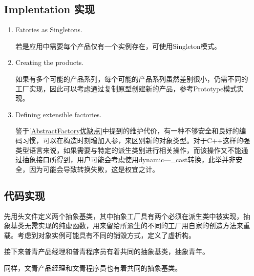 \subsection{Implentation 实现}

\begin{enumerate}

\item Fatories as Singletons.

      若是应用中需要每个产品仅有一个实例存在，可使用Singleton模式。

\item Creating the products.

      如果有多个可能的产品系列，每个可能的产品系列虽然差别很小，仍需不同的工厂实现，因此可以考虑通过复制原型创建新的产品，参考Prototype模式实现。

\item Defining extensible factories.

      鉴于\ref{AbstractFactory优缺点}中提到的维护代价，有一种不够安全和良好的编码习惯，可以在构造时刻增加入参，来区别新的对象类型。对于C++这样的强类型语言来说，如果需要与特定的派生类别进行相关操作，而该操作又不能通过抽象接口所得到，用户可能会考虑使用dynamic—_cast转换，此举并非安全，因为可能会导致转换失败，这是权宜之计。

\end{enumerate}

\subsection{代码实现}

    先用头文件定义两个抽象基类，其中抽象工厂具有两个必须在派生类中被实现，抽象基类无需实现的纯虚函数，用来留给所派生的不同的工厂用自家的创造方法来重载。考虑到对象实例可能具有不同的销毁方式，定义了虚析构。

    接下来普青产品经理和普青程序员有着共同的抽象基类，抽象青年。

    同样，文青产品经理和文青程序员也有着共同的抽象基类。

